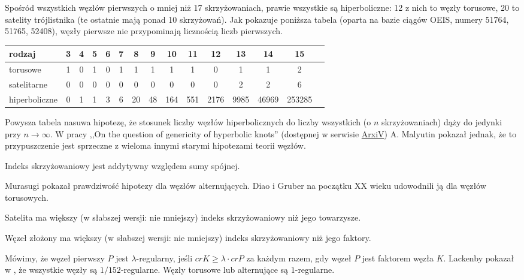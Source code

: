 Spośród wszystkich węzłów pierwszych o mniej niż 17 skrzyżowaniach, prawie wszystkie są hiperboliczne: 12 z nich to węzły torusowe, 20 to satelity trójlistnika (te ostatnie mają ponad 10 skrzyżowań).
Jak pokazuje poniższa tabela (oparta na bazie ciągów OEIS, numery 51764, 51765, 52408), węzły pierwsze nie przypominają licznością liczb pierwszych.

\renewcommand*{\arraystretch}{1.4}
\footnotesize
\begin{longtable}{lcccccccccccccc}
\hline
    \textbf{rodzaj} & 3 & 4 & 5 & 6 & 7 & 8  & 9  & 10  & 11  & 12   & 13   & 14    & 15     \\ \hline \endhead
    torusowe        & 1 & 0 & 1 & 0 & 1 & 1  & 1  & 1   & 1   & 0    & 1    & 1     & 2      \\
    satelitarne     & 0 & 0 & 0 & 0 & 0 & 0  & 0  & 0   & 0   & 0    & 2    & 2     & 6      \\
    hiperboliczne   & 0 & 1 & 1 & 3 & 6 & 20 & 48 & 164 & 551 & 2176 & 9985 & 46969 & 253285 \\
    \hline
\end{longtable}
\normalsize

Powysza tabela nasuwa hipotezę,
że stosunek liczby węzłów hiperbolicznych do liczby wszystkich
(o $n$ skrzyżowaniach) dąży do jedynki przy $n \to \infty$.
W pracy ,,On the question of genericity of hyperbolic knots'' (dostępnej w serwisie \href{https://arxiv.org/abs/1612.03368v1}{ArxiV}) A. Malyutin pokazał jednak, że to przypuszczenie jest sprzeczne z wieloma innymi starymi hipotezami teorii węzłów.

\begin{conjecture}
    Indeks skrzyżowaniowy jest addytywny względem sumy spójnej.
\end{conjecture}

Murasugi pokazał prawdziwość hipotezy dla węzłów alternujących.
Diao i Gruber na początku XX wieku udowodnili ją dla węzłów torusowych.

\begin{conjecture}
    Satelita ma większy
    (w słabszej wersji: nie mniejszy)
    indeks skrzyżowaniowy niż jego towarzysze.
\end{conjecture}

\begin{conjecture}
    Węzeł złożony ma większy
    (w słabszej wersji: nie mniejszy)
    indeks skrzyżowaniowy niż jego faktory.
\end{conjecture}

Mówimy, że węzeł pierwszy $P$ jest $\lambda$-regularny,
jeśli $cr K \ge \lambda \cdot cr P$ za każdym razem,
gdy węzeł $P$ jest faktorem węzła $K$.
Lackenby pokazał w \cite{lackenby09}, że wszystkie węzły są $1/152$-regularne.
Węzły torusowe lub alternujące są $1$-regularne.

